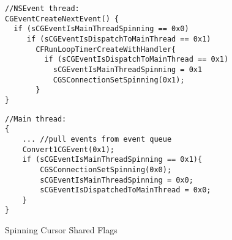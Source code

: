 \begin{figure}[t]
\begin{minipage}[t]{0.48\textwidth}
\begin{lstlisting}
//NSEvent thread:
CGEventCreateNextEvent() {
  if (sCGEventIsMainThreadSpinning == 0x0)
     if (sCGEventIsDispatchToMainThread == 0x1)
       CFRunLoopTimerCreateWithHandler{
         if (sCGEventIsDispatchToMainThread == 0x1)
           sCGEventIsMainThreadSpinning = 0x1
           CGSConnectionSetSpinning(0x1);
       }
}
\end{lstlisting}
\end{minipage}
\begin{minipage}[t]{0.48\textwidth}
\begin{lstlisting}
//Main thread:
{
	... //pull events from event queue
	Convert1CGEvent(0x1);
	if (sCGEventIsMainThreadSpinning == 0x1){
  		CGSConnectionSetSpinning(0x0);
  		sCGEventIsMainThreadSpinning = 0x0;
  		sCGEventIsDispatchedToMainThread = 0x0;
	}
}
\end{lstlisting}
\end{minipage}
\vspace{-0.7cm}
    \caption{Spinning Cursor Shared Flags}
    \label{fig:spinningcursorsharedflags}
\end{figure}
